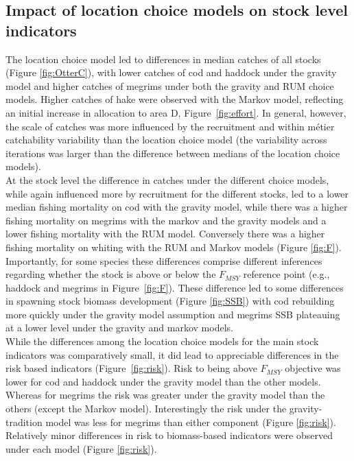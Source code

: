 \documentclass[12pt, halfline, a4paper]{ouparticle}
\begin{document}
\subsection{Impact of location choice models on stock level indicators}

The location choice model led to differences in median catches of all stocks
(Figure \ref{fig:OtterC}), with lower catches of cod and haddock under the
gravity model and higher catches of megrims under both the gravity and RUM
choice models. Higher catches of hake were observed with the Markov model,
reflecting an initial increase in allocation to area D,
Figure~\ref{fig:effort}. In general, however, the scale of catches was more
influenced by the recruitment and within métier catchability variability than
the location choice model (the variability across iterations was larger than
the difference between medians of the location choice models).\\

At the stock level the difference in catches under the different choice models,
while again influenced more by recruitment for the different stocks, led to a
lower median fishing mortality on cod with the gravity model, while there was a
higher fishing mortality on megrims with the markov and the gravity models and
a lower fishing mortality with the RUM model. Conversely there was a higher
fishing mortality on whiting with the RUM and Markov models (Figure
\ref{fig:F}). Importantly, for some species these differences comprise
different inferences regarding whether the stock is above or below the
$F_{MSY}$ reference point (e.g., haddock and megrims in Figure~\ref{fig:F}).
These difference led to some differences in spawning stock biomass development
(Figure \ref{fig:SSB}) with cod rebuilding more quickly under the gravity model
assumption and megrims SSB plateauing at a lower level under the gravity and
markov models. \\

While the differences among the location choice models for the main stock
indicators was comparatively small, it did lead to appreciable differences in
the risk based indicators (Figure~\ref{fig:risk}). Risk to being above $F_{MSY}$
objective was lower for cod and haddock under the gravity model than the other
models. Whereas for megrims the risk was greater under the gravity model than
the others (except the Markov model). Interestingly the risk under the
gravity-tradition model was less for megrims than either component (Figure
\ref{fig:risk}). Relatively minor differences in risk to biomass-based
indicators were observed under each model (Figure \ref{fig:risk}).
\end{document}
